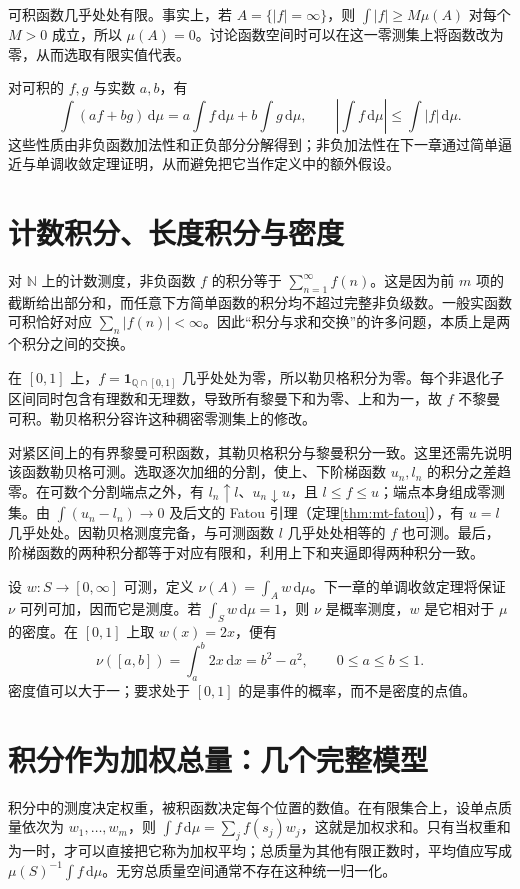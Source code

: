 可积函数几乎处处有限。事实上，若 $A=\{|f|=\infty\}$，则 $\int|f|\geq M\mu(A)$ 对每个 $M>0$ 成立，所以 $\mu(A)=0$。讨论函数空间时可以在这一零测集上将函数改为零，从而选取有限实值代表。

对可积的 $f,g$ 与实数 $a,b$，有
\[
 \int(af+bg)\,\mathrm d\mu
 =a\int f\,\mathrm d\mu+b\int g\,\mathrm d\mu,\qquad
 \left|\int f\,\mathrm d\mu\right|\leq\int|f|\,\mathrm d\mu.
\]
这些性质由非负函数加法性和正负部分分解得到；非负加法性在下一章通过简单逼近与单调收敛定理证明，从而避免把它当作定义中的额外假设。

\section{计数积分、长度积分与密度}
对 $\mathbb N$ 上的计数测度，非负函数 $f$ 的积分等于 $\sum_{n=1}^{\infty}f(n)$。这是因为前 $m$ 项的截断给出部分和，而任意下方简单函数的积分均不超过完整非负级数。一般实函数可积恰好对应 $\sum_n|f(n)|<\infty$。因此“积分与求和交换”的许多问题，本质上是两个积分之间的交换。

\begin{example}[零测修改改变黎曼可积性]
在 $[0,1]$ 上，$f=\mathbf1_{\mathbb Q\cap[0,1]}$ 几乎处处为零，所以勒贝格积分为零。每个非退化子区间同时包含有理数和无理数，导致所有黎曼下和为零、上和为一，故 $f$ 不黎曼可积。勒贝格积分容许这种稠密零测集上的修改。
\end{example}

对紧区间上的有界黎曼可积函数，其勒贝格积分与黎曼积分一致。这里还需先说明该函数勒贝格可测。选取逐次加细的分割，使上、下阶梯函数 $u_n,l_n$ 的积分之差趋零。在可数个分割端点之外，有 $l_n\uparrow l$、$u_n\downarrow u$，且 $l\leq f\leq u$；端点本身组成零测集。由 $\int(u_n-l_n)\to0$ 及后文的 Fatou 引理（定理\ref{thm:mt-fatou}），有 $u=l$ 几乎处处。因勒贝格测度完备，与可测函数 $l$ 几乎处处相等的 $f$ 也可测。最后，阶梯函数的两种积分都等于对应有限和，利用上下和夹逼即得两种积分一致。

\begin{example}[非负函数生成新的测度]
设 $w:S\to[0,\infty]$ 可测，定义 $\nu(A)=\int_Aw\,\mathrm d\mu$。下一章的单调收敛定理将保证 $\nu$ 可列可加，因而它是测度。若 $\int_Sw\,\mathrm d\mu=1$，则 $\nu$ 是概率测度，$w$ 是它相对于 $\mu$ 的密度。在 $[0,1]$ 上取 $w(x)=2x$，便有
\[
 \nu([a,b])=\int_a^b2x\,\mathrm dx=b^2-a^2,\qquad 0\leq a\leq b\leq1.
\]
密度值可以大于一；要求处于 $[0,1]$ 的是事件的概率，而不是密度的点值。
\end{example}

\section{积分作为加权总量：几个完整模型}
积分中的测度决定权重，被积函数决定每个位置的数值。在有限集合上，设单点质量依次为 $w_1,\ldots,w_m$，则 $\int f\,\mathrm d\mu=\sum_jf(s_j)w_j$，这就是加权求和。只有当权重和为一时，才可以直接把它称为加权平均；总质量为其他有限正数时，平均值应写成 $\mu(S)^{-1}\int f\,\mathrm d\mu$。无穷总质量空间通常不存在这种统一归一化。

